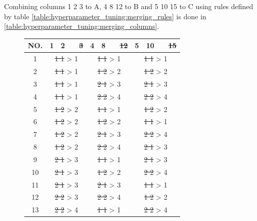 Combining columns 1 2 3 to A, 4 8 12 to B and 5 10 15 to C using rules defined by table \ref{table:hyperparameter_tuning:merging_rules} is done in \ref{table:hyperparameter_tuning:merging_columns}.

\begin{figure}[ht]
	\centering
	\begin{tabular}{ |c||cccc|cccc|cccc|  }
		\hline
		NO.& 1 & 2 & & \sout{3} & 4 & 8 & &  \sout{12} & 5 & 10 & &  \sout{15}\\
		\hline
		1  & \multicolumn{4}{c}{\sout{1 1} > 1 } & \multicolumn{4}{|c|}{\sout{1 1} > 1 } & \multicolumn{4}{c|}{\sout{1 1} > 1 }\\
		2  & \multicolumn{4}{c}{\sout{1 1} > 1 } & \multicolumn{4}{|c|}{\sout{1 2} > 2 } & \multicolumn{4}{c|}{\sout{1 2} > 2 }\\
		3  & \multicolumn{4}{c}{\sout{1 1} > 1 } & \multicolumn{4}{|c|}{\sout{2 1} > 3 } & \multicolumn{4}{c|}{\sout{2 1} > 3 }\\
		4  & \multicolumn{4}{c}{\sout{1 1} > 1 } & \multicolumn{4}{|c|}{\sout{2 2} > 4 } & \multicolumn{4}{c|}{\sout{2 2} > 4 }\\
		5  & \multicolumn{4}{c}{\sout{1 2} > 2 } & \multicolumn{4}{|c|}{\sout{1 1} > 1 } & \multicolumn{4}{c|}{\sout{1 2} > 2 }\\
		6  & \multicolumn{4}{c}{\sout{1 2} > 2 } & \multicolumn{4}{|c|}{\sout{1 2} > 2 } & \multicolumn{4}{c|}{\sout{1 1} > 1 }\\
		7  & \multicolumn{4}{c}{\sout{1 2} > 2 } & \multicolumn{4}{|c|}{\sout{2 1} > 3 } & \multicolumn{4}{c|}{\sout{2 2} > 4 }\\
		8  & \multicolumn{4}{c}{\sout{1 2} > 2 } & \multicolumn{4}{|c|}{\sout{2 2} > 4 } & \multicolumn{4}{c|}{\sout{2 1} > 3 }\\
		9  & \multicolumn{4}{c}{\sout{2 1} > 3 } & \multicolumn{4}{|c|}{\sout{1 1} > 1 } & \multicolumn{4}{c|}{\sout{2 1} > 3 }\\
		10 & \multicolumn{4}{c}{\sout{2 1} > 3 } & \multicolumn{4}{|c|}{\sout{1 2} > 2 } & \multicolumn{4}{c|}{\sout{2 2} > 4 }\\
		11 & \multicolumn{4}{c}{\sout{2 1} > 3 } & \multicolumn{4}{|c|}{\sout{2 1} > 3 } & \multicolumn{4}{c|}{\sout{1 1} > 1 }\\
		12 & \multicolumn{4}{c}{\sout{2 2} > 3 } & \multicolumn{4}{|c|}{\sout{2 2} > 4 } & \multicolumn{4}{c|}{\sout{1 2} > 2 }\\
		13 & \multicolumn{4}{c}{\sout{2 2} > 4 } & \multicolumn{4}{|c|}{\sout{1 1} > 1 } & \multicolumn{4}{c|}{\sout{2 2} > 4 }\\

\end{tabular}
\end{figure}
